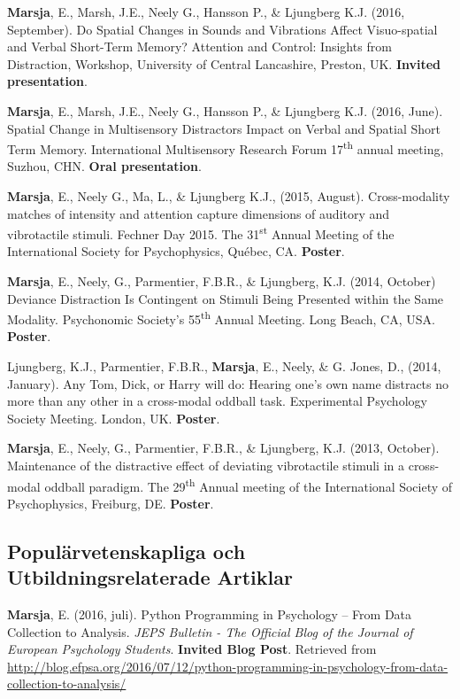 \documentclass[]{article}
\begin{document}
\textbf{Marsja}, E., Marsh, J.E., Neely G., Hansson P., \& Ljungberg
K.J. (2016, September). Do Spatial Changes in Sounds and Vibrations
Affect Visuo-spatial and Verbal Short-Term Memory? Attention and
Control: Insights from Distraction, Workshop, University of Central
Lancashire, Preston, UK. \textbf{Invited presentation}.

\textbf{Marsja}, E., Marsh, J.E., Neely G., Hansson P., \& Ljungberg
K.J. (2016, June). Spatial Change in Multisensory Distractors Impact on
Verbal and Spatial Short Term Memory. International Multisensory
Research Forum 17\textsuperscript{th} annual meeting, Suzhou, CHN.
\textbf{Oral presentation}.

\textbf{Marsja}, E., Neely G., Ma, L., \& Ljungberg K.J., (2015,
August). Cross-modality matches of intensity and attention capture
dimensions of auditory and vibrotactile stimuli. Fechner Day 2015. The
31\textsuperscript{st} Annual Meeting of the International Society for
Psychophysics, Québec, CA. \textbf{Poster}.

\textbf{Marsja}, E., Neely, G., Parmentier, F.B.R., \& Ljungberg, K.J.
(2014, October) Deviance Distraction Is Contingent on Stimuli Being
Presented within the Same Modality. Psychonomic Society's
55\textsuperscript{th} Annual Meeting. Long Beach, CA, USA.
\textbf{Poster}.

Ljungberg, K.J., Parmentier, F.B.R., \textbf{Marsja}, E., Neely, \& G.
Jones, D., (2014, January). Any Tom, Dick, or Harry will do: Hearing
one's own name distracts no more than any other in a cross-modal oddball
task. Experimental Psychology Society Meeting. London, UK.
\textbf{Poster}.

\textbf{Marsja}, E., Neely, G., Parmentier, F.B.R., \& Ljungberg, K.J.
(2013, October). Maintenance of the distractive effect of deviating
vibrotactile stimuli in a cross-modal oddball paradigm. The
29\textsuperscript{th} Annual meeting of the International Society of
Psychophysics, Freiburg, DE. \textbf{Poster}.

\hypertarget{populuxe4rvetenskapliga-och-utbildningsrelaterade-artiklar}{%
\subsection{Populärvetenskapliga och Utbildningsrelaterade
Artiklar}\label{populuxe4rvetenskapliga-och-utbildningsrelaterade-artiklar}}

\textbf{Marsja}, E. (2016, juli). Python Programming in Psychology --
From Data Collection to Analysis. \emph{JEPS Bulletin - The Official
Blog of the Journal of European Psychology Students}. \textbf{Invited
Blog Post}. Retrieved from \sloppy
\url{http://blog.efpsa.org/2016/07/12/python-programming-in-psychology-from-data-collection-to-analysis/}
\end{document}
